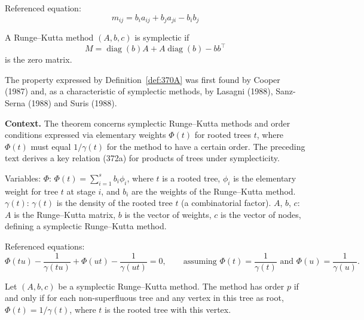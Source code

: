 Referenced equation:
\begin{equation}
    m_{ij}=b_i a_{ij}+b_j a_{ji}-b_i b_j \tag{370a}
\end{equation}

\begin{definition}

  \label{def:370A}
A Runge--Kutta method $(A, b, c)$ is symplectic if
\[
M = \operatorname{diag}(b)A + A \operatorname{diag}(b) - bb^{\top}
\]
is the zero matrix.

The property expressed by Definition~\ref{def:370A} was first found by Cooper (1987) and, as a characteristic of symplectic methods, by Lasagni (1988), Sanz-Serna (1988) and Suris (1988).
\end{definition}

\noindent\textbf{Context.}
The theorem concerns symplectic Runge--Kutta methods and order conditions expressed via elementary weights $\Phi(t)$ for rooted trees $t$, where $\Phi(t)$ must equal $1/\gamma(t)$ for the method to have a certain order. The preceding text derives a key relation (372a) for products of trees under symplecticity.

Variables:
$\Phi$: $\Phi(t) = \sum_{i=1}^s b_i \phi_i$, where $t$ is a rooted tree, $\phi_i$ is the elementary weight for tree $t$ at stage $i$, and $b_i$ are the weights of the Runge--Kutta method.
$\gamma(t)$: $\gamma(t)$ is the density of the rooted tree $t$ (a combinatorial factor).
$A$, $b$, $c$: $A$ is the Runge--Kutta matrix, $b$ is the vector of weights, $c$ is the vector of nodes, defining a symplectic Runge--Kutta method.

Referenced equations:
\begin{equation}
\Phi(tu) - \frac{1}{\gamma(tu)} + \Phi(ut) - \frac{1}{\gamma(ut)} = 0,
\qquad \text{assuming } \Phi(t) = \frac{1}{\gamma(t)} \text{ and } \Phi(u) = \frac{1}{\gamma(u)}.
\tag{372a}
\end{equation}

\begin{theorem}

  \label{thm:372A}
Let $(A, b, c)$ be a symplectic Runge--Kutta method. The method has order $p$ if and only if for each non-superfluous tree and any vertex in this tree as root, $\Phi(t) = 1/\gamma(t)$, where $t$ is the rooted tree with this vertex.
\end{theorem}

